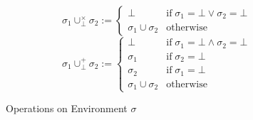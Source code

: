 \documentclass[a4j, dvipdfmx]{jsarticle}
\theoremstyle{definition}
\begin{document}
\begin{figure}[H]
  \begin{equation*}
    \sigma_1\cup^\times_\bot\sigma_2 :=
    \begin{cases}
      \bot                 &\text{if}\;\sigma_1=\bot\vee\sigma_2=\bot \\
      \sigma_1\cup\sigma_2 &\text{otherwise}
    \end{cases}
  \end{equation*}
  \begin{equation*}
    \sigma_1\cup^+_\bot\sigma_2 :=
    \begin{cases}
      \bot                 &\text{if}\;\sigma_1=\bot\wedge\sigma_2=\bot \\
      \sigma_1             &\text{if}\;\sigma_2=\bot \\
      \sigma_2             &\text{if}\;\sigma_1=\bot \\
      \sigma_1\cup\sigma_2 &\text{otherwise}
    \end{cases}
  \end{equation*}
  \caption{Operations on Environment $\sigma$}
  \label{fig:op_env}
\end{figure}
\end{document}
